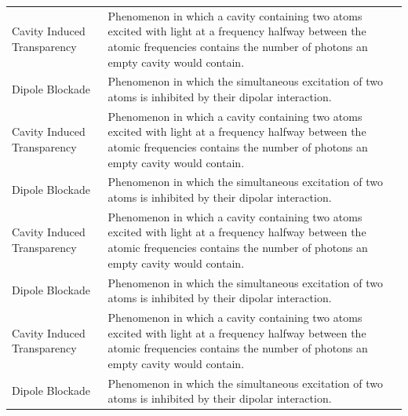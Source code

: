 \begin{longtable}{l p{}}
    Cavity Induced Transparency & Phenomenon in which a cavity containing two atoms excited with light at a frequency halfway between the atomic frequencies contains the number of photons an empty cavity would contain. \\
    Dipole Blockade             & Phenomenon in which the simultaneous excitation of two atoms is inhibited by their dipolar interaction.                                                                                  \\
    Cavity Induced Transparency & Phenomenon in which a cavity containing two atoms excited with light at a frequency halfway between the atomic frequencies contains the number of photons an empty cavity would contain. \\
    Dipole Blockade             & Phenomenon in which the simultaneous excitation of two atoms is inhibited by their dipolar interaction.                                                                                  \\
    Cavity Induced Transparency & Phenomenon in which a cavity containing two atoms excited with light at a frequency halfway between the atomic frequencies contains the number of photons an empty cavity would contain. \\
    Dipole Blockade             & Phenomenon in which the simultaneous excitation of two atoms is inhibited by their dipolar interaction.                                                                                  \\
    Cavity Induced Transparency & Phenomenon in which a cavity containing two atoms excited with light at a frequency halfway between the atomic frequencies contains the number of photons an empty cavity would contain. \\
    Dipole Blockade             & Phenomenon in which the simultaneous excitation of two atoms is inhibited by their dipolar interaction.
\end{longtable}

